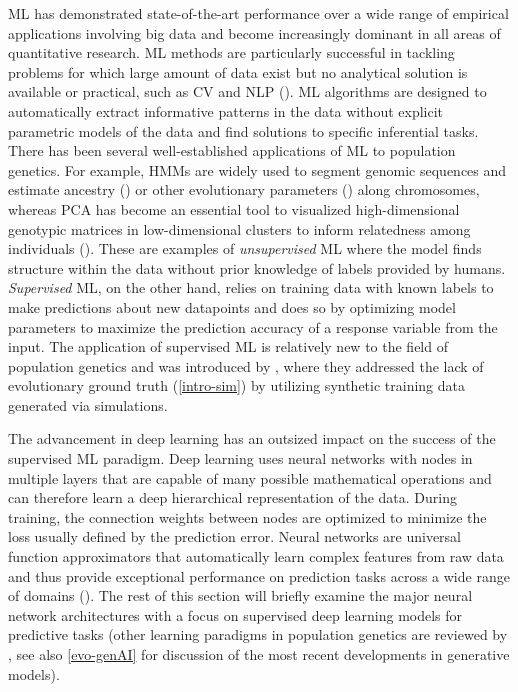 \Acf{ML} has demonstrated state-of-the-art performance over a wide range of empirical applications involving big data and become increasingly dominant in all areas of quantitative research. \ac{ML} methods are particularly successful in tackling problems for which large amount of data exist but no analytical solution is available or practical, such as \ac{CV} and \ac{NLP} (\cite{huang_harnessing_2023}). \ac{ML} algorithms are designed to automatically extract informative patterns in the data without explicit parametric models of the data and find solutions to specific inferential tasks. There has been several well-established applications of \ac{ML} to population genetics. For example, \acfp{HMM} are widely used to segment genomic sequences and estimate ancestry (\cite{li2003modeling}) or other evolutionary parameters (\cite{kern2010population,siepel2005evolutionarily,boitard2009detecting,felsenstein1996hidden}) along chromosomes, whereas \acf{PCA} has become an essential tool to visualized high-dimensional genotypic matrices in low-dimensional clusters to inform relatedness among individuals (\cite{schrider_supervised_2018}). These are examples of \textit{unsupervised} \ac{ML} where the model finds structure within the data without prior knowledge of labels provided by humans. \textit{Supervised} \ac{ML}, on the other hand, relies on training data with known labels to make predictions about new datapoints and does so by optimizing model parameters to maximize the prediction accuracy of a response variable from the input. The application of supervised \ac{ML} is relatively new to the field of population genetics and was introduced by \cite{pavlidis2010searching}, where they addressed the lack of evolutionary ground truth (\ref{intro-sim}) by utilizing synthetic training data generated via simulations. 

The advancement in deep learning has an outsized impact on the success of the supervised \ac{ML} paradigm. Deep learning uses neural networks with nodes in multiple layers that are capable of many possible mathematical operations and can therefore learn a deep hierarchical representation of the data. During training, the connection weights between nodes are optimized to minimize the loss usually defined by the prediction error. Neural networks are universal function approximators that automatically learn complex features from raw data and thus provide exceptional performance on prediction tasks across a wide range of domains (\cite{lecun_deep_2015}). The rest of this section will briefly examine the major neural network architectures with a focus on supervised deep learning models for predictive tasks (other learning paradigms in population genetics are reviewed by \cite{huang_harnessing_2023,korfmann_deep_2023}, see also \ref{evo-genAI} for discussion of the most recent developments in generative models).

